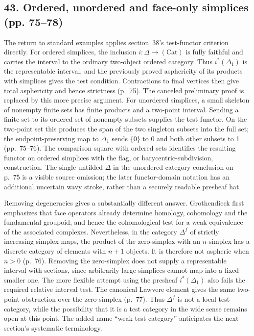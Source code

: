 \subsection*{43. Ordered, unordered and face-only simplices (pp. 75--78)}
The return to standard examples applies section~38's test-functor criterion directly. For ordered simplices, the inclusion $i:\Delta\to(\mathrm{Cat})$ is fully faithful and carries the interval to the ordinary two-object ordered category. Thus $i^*(\Delta_1)$ is the representable interval, and the previously proved asphericity of its products with simplices gives the test condition. Contractions to final vertices then give total asphericity and hence strictness (p.~75). The canceled preliminary proof is replaced by this more precise argument. For unordered simplices, a small skeleton of nonempty finite sets has finite products and a two-point interval. Sending a finite set to its ordered set of nonempty subsets supplies the test functor. On the two-point set this produces the span of the two singleton subsets into the full set; the endpoint-preserving map to $\Delta_1$ sends $\{0\}$ to 0 and both other subsets to 1 (pp.~75--76). The comparison square with ordered sets identifies the resulting functor on ordered simplices with the flag, or barycentric-subdivision, construction. The single untilded $\Delta$ in the unordered-category conclusion on p.~75 is a visible source omission; the later functor-domain notation has an additional uncertain wavy stroke, rather than a securely readable presheaf hat.

Removing degeneracies gives a substantially different answer. Grothendieck first emphasizes that face operators already determine homology, cohomology and the fundamental groupoid, and hence the cohomological test for a weak equivalence of the associated complexes. Nevertheless, in the category $\Delta^f$ of strictly increasing simplex maps, the product of the zero-simplex with an $n$-simplex has a discrete category of elements with $n+1$ objects. It is therefore not aspheric when $n>0$ (p.~76). Removing the zero-simplex does not supply a representable interval with sections, since arbitrarily large simplices cannot map into a fixed smaller one. The more flexible attempt using the presheaf $i^*(\Delta_1)$ also fails the required relative interval test. The canonical Lawvere element gives the same two-point obstruction over the zero-simplex (p.~77). Thus $\Delta^f$ is not a local test category, while the possibility that it is a test category in the wide sense remains open at this point. The added name ``weak test category'' anticipates the next section's systematic terminology.

